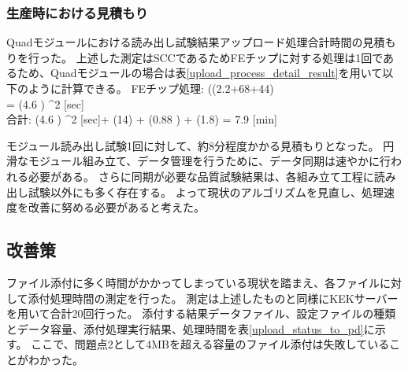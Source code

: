 \subsubsection{生産時における見積もり}
Quadモジュールにおける読み出し試験結果アップロード処理合計時間の見積もりを行った。
上述した測定はSCCであるためFEチップに対する処理は1回であるため、Quadモジュールの場合は表\ref{upload_process_detail_result}を用いて以下のように計算できる。
\bbb
{\rm FE}チップ処理: ((2.2+68+44) \pm {}  \\\nonumber 
= (4.6  ) ^2 [{\rm sec}]\\
合計: (4.6  ) ^2 [\rm{sec}]+ (14) + (0.88 ) + (1.8) = 7.9  [{\rm min}]
\eee

モジュール読み出し試験1回に対して、約8分程度かかる見積もりとなった。
円滑なモジュール組み立て、データ管理を行うために、データ同期は速やかに行われる必要がある。
さらに同期が必要な品質試験結果は、各組み立て工程に読み出し試験以外にも多く存在する。
よって現状のアルゴリズムを見直し、処理速度を改善に努める必要があると考えた。

\subsection{改善策}

ファイル添付に多く時間がかかってしまっている現状を踏まえ、各ファイルに対して添付処理時間の測定を行った。
測定は上述したものと同様にKEKサーバーを用いて合計20回行った。
添付する結果データファイル、設定ファイルの種類とデータ容量、添付処理実行結果、処理時間を表\ref{upload_status_to_pd}に示す。
ここで、問題点2として4MBを超える容量のファイル添付は失敗していることがわかった。

